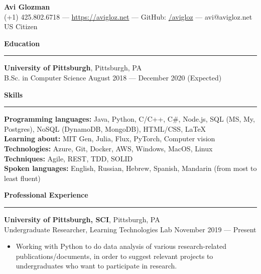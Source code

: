 \documentclass[11pt]{article}
\begin{document}
	\pagestyle{empty}
	\begin{center}
		{\LARGE \textbf{Avi Glozman}}\\
		\vspace{1.25mm}
		{\large (+1) 425.802.6718 --- \href{https://avigloz.net}{https://avigloz.net} --- GitHub: \href{https://github.com/avigloz}{/avigloz} --- avi@avigloz.net}\\
		\vspace{1mm}
		US Citizen
	\end{center}
	
	\begin{flushleft}
		
		\vspace{-1.5mm}
		{\large \raggedright \textbf{Education}}
		\vspace{1.25mm}
	
		\hrule
	
		\vspace{2.25mm}
		\textbf{University of Pittsburgh}, Pittsburgh, PA\\
		{\small B.Sc. in Computer Science \hfill August 2018 --- December 2020 (Expected)}
	
		\vspace{1.5mm}
		{\large \raggedright \textbf{Skills}}
		\vspace{1.25mm}
	
		\hrule
	
		\vspace{2.25mm}
		\textbf{Programming languages:} Java, Python, C/C++, C\#, Node.js, SQL (MS, My, Postgres), NoSQL (DynamoDB, MongoDB), HTML/CSS, \LaTeX\\
		\textbf{Learning about:} MIT Gen, Julia, Flux, PyTorch, Computer vision\\
		\textbf{Technologies:} Azure, Git, Docker, AWS, Windows, MacOS, Linux\\
		\textbf{Techniques:} Agile, REST, TDD, SOLID\\
		\textbf{Spoken languages:} English, Russian, Hebrew, Spanish, Mandarin (from most to least fluent)
		
		\vspace{1.5mm}
		{\large \raggedright \textbf{Professional Experience}}
		\vspace{1.25mm}
	
		\hrule

		\vspace{2.25mm}
		\textbf{University of Pittsburgh, SCI}, Pittsburgh, PA\\
		{\small Undergraduate Researcher, Learning Technologies Lab \hfill November 2019 --- Present}
		\vspace{-1.25mm}
		\begin{itemize}
				\item Working with Python to do data analysis of various research-related publications/documents, in order to suggest relevant projects to undergraduates who want to participate in research.
		\end{itemize}


\end{flushleft}
\end{document}
